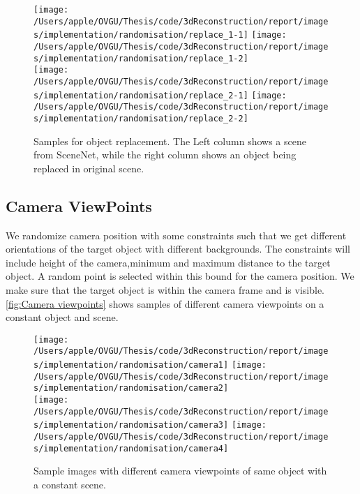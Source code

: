 \begin{figure}
    \centering
    \texttt{[image: /Users/apple/OVGU/Thesis/code/3dReconstruction/report/images/implementation/randomisation/replace\_1-1]}
    \texttt{[image: /Users/apple/OVGU/Thesis/code/3dReconstruction/report/images/implementation/randomisation/replace\_1-2]} \\
    \vspace{0.1cm}
    \texttt{[image: /Users/apple/OVGU/Thesis/code/3dReconstruction/report/images/implementation/randomisation/replace\_2-1]}
    \texttt{[image: /Users/apple/OVGU/Thesis/code/3dReconstruction/report/images/implementation/randomisation/replace\_2-2]}\\
    \caption[Samples for Object Replacement]{Samples for object replacement. The Left column shows a scene from SceneNet, while the right column shows an object being replaced in original scene.}
    \label{fig:replace model}
\end{figure}


\subsection{Camera ViewPoints}\label{subsec:camera-viewpoints}

We randomize camera position with some constraints such that we get different orientations of the target object with different backgrounds.
The constraints will include height of the camera,minimum and maximum distance to the target object.
A random point is selected within this bound for the camera position.
We make sure that the target object is within the camera frame and is visible.
\autoref{fig:Camera viewpoints} shows samples of different camera viewpoints on a constant object and scene.

\begin{figure}
    \centering
    \texttt{[image: /Users/apple/OVGU/Thesis/code/3dReconstruction/report/images/implementation/randomisation/camera1]}
    \texttt{[image: /Users/apple/OVGU/Thesis/code/3dReconstruction/report/images/implementation/randomisation/camera2]}\\
    \vspace{0.1cm}
    \texttt{[image: /Users/apple/OVGU/Thesis/code/3dReconstruction/report/images/implementation/randomisation/camera3]}
    \texttt{[image: /Users/apple/OVGU/Thesis/code/3dReconstruction/report/images/implementation/randomisation/camera4]}\\
    \caption[Samples for Camera ViewPoints.]{Sample images with different camera viewpoints of same object with a constant scene.}
    \label{fig:Camera viewpoints}
\end{figure}


